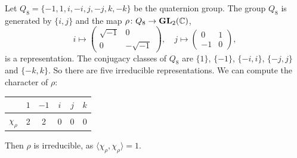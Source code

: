 \begin{example}



\end{example}

\begin{example}
    Let $Q_8=\{-1,1,i,-i,j,-j,k,-k\}$ be the quaternion group. 
    The group $Q_8$ is generated by $\{i,j\}$ and the map $\rho\colon Q_8\to\mathbf{GL}_2(\mathbb{C})$, 
    \[
    i\mapsto\begin{pmatrix}
    \sqrt{-1}&0\\0&-\sqrt{-1}
    \end{pmatrix},
    \quad
    j\mapsto\begin{pmatrix}
    0&1\\-1&0
    \end{pmatrix},
    \]
    is a representation.
    The conjugacy classes of $Q_8$ are $\{1\}$, $\{-1\}$, $\{-i,i\}$, $\{-j,j\}$ and $\{-k,k\}$. 
    So there are five irreducible representations. 
    We can compute the character of $\rho$:
    	\begin{center}
		\begin{tabular}{|c|c|c|c|c|c|}
		    \hline
			& $1$ & $-1$ & $i$ & $j$ & $k$\tabularnewline
			\hline
			$\chi_\rho$ & 2 & 2 & 0 & 0 & 0\tabularnewline
			\hline
		\end{tabular}
	\end{center}
	Then $\rho$ is irreducible, as $\langle\chi_\rho,\chi_\rho\rangle=1$. 
	

\end{example}
